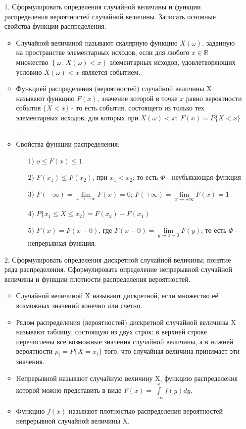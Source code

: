 \documentclass[a4paper]{article}
\begin{document}
\begin{enumerate}
\item[1.] Сформулировать определения случайной величины и функции распределения вероятностей случайной величины. Записать основные свойства функции распределения. \\
\begin{itemize}
\item Случайной величиной называют скалярную функцию $X(\omega)$, заданную на пространстве элементарных исходов, если для любого $x \in \mathbb{R}$ множество $\left\{\omega: \ X(\omega) < x\right\}$ элементарных исходов, удовлетворяющих условию $X(\omega) < x$ является событием.
\item Функцией распределения (вероятностей) случайной величины X называют функцию $F(x)$, значение которой в точке $x$ равно вероятности события $\{X < x\}$ - то есть события, состоящего из только тех элементарных исходов, для которых при $X(\omega) < x: \ F(x) = P\{X < x\}$.
\item Свойства функции распределения:
	\begin{enumerate}
	\item[1)] $o \leqslant F(x) \leqslant 1$
	\item[2)] $F(x_1) \leqslant F(x_2)$, при $x_1 < x_2$; то есть $\Phi$ - неубывающая функция
	\item[3)] $F(-\infty) = \lim\limits_{x \to -\infty} F(x) = 0$; $F(+\infty) = \lim\limits_{x \to +\infty} F(x) = 1$
	\item[4)] $P\{x_1 \leqslant X \leqslant x_2\} = F(x_2) - F(x_1)$
	\item[5)] $F(x) = F(x - 0)$, где $F(x - 0) = \lim\limits_{y \to x - 0} F(y)$; то есть $\Phi$ - непрерывная функция.
	\end{enumerate}
\end{itemize}


\item[2.] Сформулировать определения дискретной случайной величины; понятие ряда распределения. Сформулировать определение непрерывной случайной величины и функции плотности распределения вероятностей. \\
\begin{itemize}
\item Случайной величиной X называют дискретной, если множество её возможных значений конечно или счетно.
\item Рядом распределения (вероятностей) дискретной случайной величины X называют таблицу, состоящую из двух строк: в верхней строке перечислены все возможные значения случайной величины, а в нижней вероятности $p_i = P\{X = x_i\}$ того, что случайная величина принимает эти значения. 
\item Непрерывной называют случайную величину X, функцию распределения которой можно представить в виде $\displaystyle  F(x) = \int\limits_{-\infty}^{x} f(y) dy$.
\item Функцию $f(x)$ называют плотностью распределения вероятностей непрерывной случайной величины X.
\end{itemize}



\end{enumerate}
\end{document}
